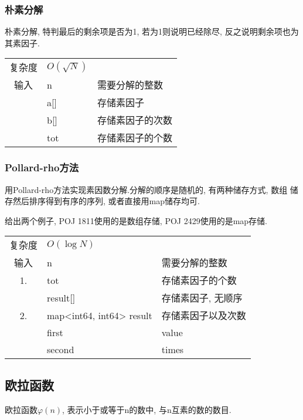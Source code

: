         \subsubsection{朴素分解}\small
朴素分解, 特判最后的剩余项是否为1, 若为1则说明已经除尽, 反之说明剩余项也为
其素因子.

\begin{longtable}{|c|l|l|}
复杂度 & $O(\sqrt{N})$ &  \\
输入 & n & 需要分解的整数 \\
 & a[] & 存储素因子 \\
 & b[] & 存储素因子的次数 \\
 & tot & 存储素因子的个数 \\
\end{longtable}



        \subsubsection{Pollard-rho方法}\small
用Pollard-rho方法实现素因数分解.分解的顺序是随机的, 有两种储存方式, 数组
储存然后排序得到有序的序列, 或者直接用map储存均可.

给出两个例子, POJ 1811使用的是数组存储, POJ 2429使用的是map存储.

\begin{longtable}{|c|l|l|}
复杂度 & $O(\log N)$ &  \\
输入 & n & 需要分解的整数 \\
 1. & tot & 存储素因子的个数 \\
 & result[] & 存储素因子, 无顺序 \\
 2. & map<int64, int64> result & 存储素因子以及次数 \\
 & first & value \\
 & second & times \\
\end{longtable}



    \subsection{欧拉函数}\small
欧拉函数$\varphi (n)$, 表示小于或等于n的数中, 与n互素的数的数目.

